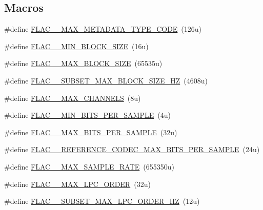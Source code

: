 \subsection*{Macros}
\begin{DoxyCompactItemize}
\item 
\#define \mbox{\hyperlink{group__flac__format_ga626a412545818c2271fa2202c02ff1d6}{F\+L\+A\+C\+\_\+\+\_\+\+M\+A\+X\+\_\+\+M\+E\+T\+A\+D\+A\+T\+A\+\_\+\+T\+Y\+P\+E\+\_\+\+C\+O\+DE}}~(126u)
\item 
\#define \mbox{\hyperlink{group__flac__format_gaa5a85c2ea434221ce684be3469517003}{F\+L\+A\+C\+\_\+\+\_\+\+M\+I\+N\+\_\+\+B\+L\+O\+C\+K\+\_\+\+S\+I\+ZE}}~(16u)
\item 
\#define \mbox{\hyperlink{group__flac__format_gaef78bc1b04f721e7b4563381f5514e8d}{F\+L\+A\+C\+\_\+\+\_\+\+M\+A\+X\+\_\+\+B\+L\+O\+C\+K\+\_\+\+S\+I\+ZE}}~(65535u)
\item 
\#define \mbox{\hyperlink{group__flac__format_ga8f6ba2c28fbfcf52326d115c95b0a751}{F\+L\+A\+C\+\_\+\+\_\+\+S\+U\+B\+S\+E\+T\+\_\+\+M\+A\+X\+\_\+\+B\+L\+O\+C\+K\+\_\+\+S\+I\+Z\+E\+\_\+HZ}}~(4608u)
\item 
\#define \mbox{\hyperlink{group__flac__format_ga488aa5678a58d08f984f5d39185b763d}{F\+L\+A\+C\+\_\+\+\_\+\+M\+A\+X\+\_\+\+C\+H\+A\+N\+N\+E\+LS}}~(8u)
\item 
\#define \mbox{\hyperlink{group__flac__format_ga30b0f21abbb2cdfd461fe04b425b5438}{F\+L\+A\+C\+\_\+\+\_\+\+M\+I\+N\+\_\+\+B\+I\+T\+S\+\_\+\+P\+E\+R\+\_\+\+S\+A\+M\+P\+LE}}~(4u)
\item 
\#define \mbox{\hyperlink{group__flac__format_gad0156d56751e80241fa349d1e25064a6}{F\+L\+A\+C\+\_\+\+\_\+\+M\+A\+X\+\_\+\+B\+I\+T\+S\+\_\+\+P\+E\+R\+\_\+\+S\+A\+M\+P\+LE}}~(32u)
\item 
\#define \mbox{\hyperlink{group__flac__format_ga0fc418d96053d385fd2f56dce8007fbc}{F\+L\+A\+C\+\_\+\+\_\+\+R\+E\+F\+E\+R\+E\+N\+C\+E\+\_\+\+C\+O\+D\+E\+C\+\_\+\+M\+A\+X\+\_\+\+B\+I\+T\+S\+\_\+\+P\+E\+R\+\_\+\+S\+A\+M\+P\+LE}}~(24u)
\item 
\#define \mbox{\hyperlink{group__flac__format_ga99abeef0c05c6bc76eacfa865abbfa70}{F\+L\+A\+C\+\_\+\+\_\+\+M\+A\+X\+\_\+\+S\+A\+M\+P\+L\+E\+\_\+\+R\+A\+TE}}~(655350u)
\item 
\#define \mbox{\hyperlink{group__flac__format_ga16108d413f524329f338cff6e05f3aff}{F\+L\+A\+C\+\_\+\+\_\+\+M\+A\+X\+\_\+\+L\+P\+C\+\_\+\+O\+R\+D\+ER}}~(32u)
\item 
\#define \mbox{\hyperlink{group__flac__format_ga9791efa78147196820c86a6041d7774d}{F\+L\+A\+C\+\_\+\+\_\+\+S\+U\+B\+S\+E\+T\+\_\+\+M\+A\+X\+\_\+\+L\+P\+C\+\_\+\+O\+R\+D\+E\+R\+\_\+HZ}}~(12u)

\end{DoxyCompactItemize}
